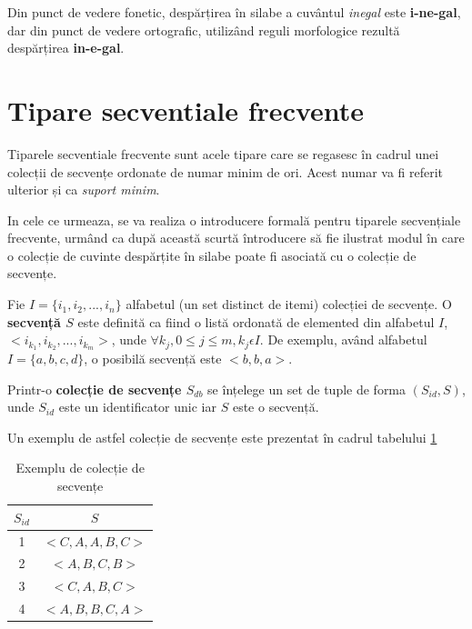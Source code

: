 \begin{ex}
Din punct de vedere fonetic, despărțirea în silabe a cuvântul \textit{inegal} este \textbf{i-ne-gal}, dar din punct de vedere ortografic, utilizând reguli morfologice rezultă despărțirea \textbf{in-e-gal}. 
\end{ex}

\section{Tipare secventiale frecvente}

Tiparele secventiale frecvente sunt acele tipare care se regasesc în cadrul unei colecții de secvențe ordonate de numar minim de ori. Acest numar va fi referit ulterior și ca \textit{suport minim}. 

In cele ce urmeaza, se va realiza o introducere formală pentru tiparele secvențiale frecvente, urmând ca după această scurtă întroducere să fie ilustrat modul în care o colecție de cuvinte despărțite în silabe poate fi asociată cu o colecție de secvențe.

\begin{defi}
Fie $I = \{i_1, i_2, ...,i_n\}$ alfabetul (un set distinct de itemi) colecției de secvențe. O \textbf{secvență $S$} este definită ca fiind o listă ordonată de elemented din alfabetul $I$, $<i_{k_1},i_{k_2}, ...,i_{k_m}>$, unde $\forall k_j, 0 \leq j \leq m, k_j \epsilon I$. 
De exemplu, având alfabetul $I=\{a,b,c,d\}$, o posibilă secvență este $<b,b,a>$.
\end{defi}

\begin{defi} 
Printr-o \textbf{colecție de secvențe $S_{db}$} se înțelege un set de tuple de forma $(S_{id}, S)$, unde $S_{id}$ este un identificator unic iar $S$ este o secvență. 
\end{defi}

\begin{ex}
Un exemplu de astfel colecție de secvențe este prezentat în cadrul tabelului \ref{table:sdb}
\end{ex}

\begin{table}[h]
\centering    
\begin{tabular}{|c|c|}    
\hline      
$S_{id}$ & $S$ \\
\hline                    
1 & $<C,A,A,B,C>$ \\
2 & $<A,B,C,B>$ \\
3 & $<C,A,B,C>$ \\
4 & $<A,B,B,C,A>$ \\
\hline                              
\end{tabular}
\caption{Exemplu de colecție de secvențe}
\label{table:sdb}               
\end{table}

